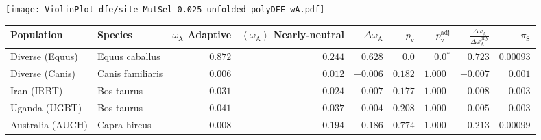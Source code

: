 \begin{center}
\texttt{[image: ViolinPlot-dfe/site-MutSel-0.025-unfolded-polyDFE-wA.pdf]} 
\begin{adjustbox}{width = 1\textwidth}
\begin{tabular}{|l|l|r|r|r|r|r|r|r|}
\toprule
                     Population &              Species & \specialcell{$\omega_{\mathrm{A}}$ \\ Adaptive} & \specialcell{$\left< \omega_{\mathrm{A}} \right>$ \\ Nearly-neutral} & $\Delta \omega_{\mathrm{A}} $ & $p_{\mathrm{v}}$ & $p_{\mathrm{v}}^{\mathrm{adj}}$ & $\frac{\Delta\omega_{\mathrm{A}}}{\Delta\omega_{\mathrm{A}}^{\mathrm{phy}}}$ & $\pi_{\textrm{S}}$ \\
\midrule
                Diverse (Equus) &       Equus caballus &                                        $ 0.872$ &                                           $ 0.244$ &                      $ 0.628$ &            $0.0$ &                  $\bm{0.0{^*}}$ &                                           $ 0.723$ &          $0.00093$ \\
                Diverse (Canis) &     Canis familiaris &                                        $ 0.006$ &                                           $ 0.012$ &                      $-0.006$ &         $ 0.182$ &                      $ 1.000~~$ &                                           $-0.007$ &           $ 0.001$ \\
                    Iran (IRBT) &           Bos taurus &                                        $ 0.031$ &                                           $ 0.024$ &                      $ 0.007$ &         $ 0.177$ &                      $ 1.000~~$ &                                           $ 0.008$ &           $ 0.003$ \\
                  Uganda (UGBT) &           Bos taurus &                                        $ 0.041$ &                                           $ 0.037$ &                      $ 0.004$ &         $ 0.208$ &                      $ 1.000~~$ &                                           $ 0.005$ &           $ 0.003$ \\
               Australia (AUCH) &         Capra hircus &                                        $ 0.008$ &                                           $ 0.194$ &                      $-0.186$ &         $ 0.774$ &                      $ 1.000~~$ &                                           $-0.213$ &          $0.00099$ \\

\end{tabular}
\end{adjustbox}
\end{center}
